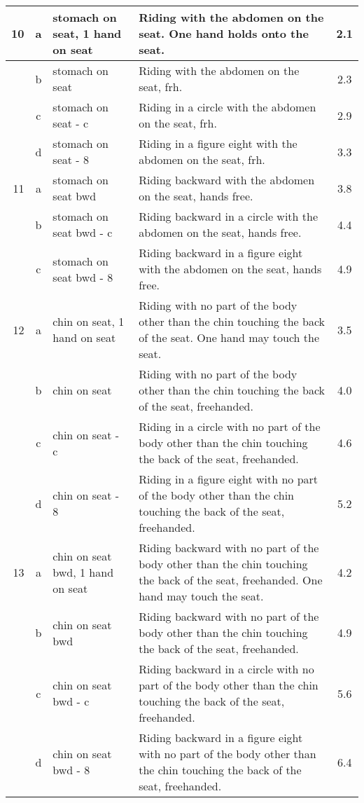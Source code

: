 \begin{longtable}{|r|c|p{4cm}|p{8cm}|c|}
\hline
10  & a & stomach on seat, 1 hand on seat & Riding with the abdomen on the seat. One hand holds onto the seat.  & 2.1 \\ 
\hline
  & b & stomach on seat & Riding with the abdomen on the seat, frh. & 2.3 \\ 
\hline
  & c & stomach on seat - c & Riding in a circle with the abdomen on the seat, frh. & 2.9 \\ 
\hline
  & d & stomach on seat - 8 & Riding in a figure eight with the abdomen on the seat, frh. & 3.3 \\ 
\hline
11  & a & stomach on seat bwd & Riding backward with the abdomen on the seat, hands free. & 3.8 \\ 
\hline
  & b & stomach on seat bwd - c & Riding backward in a circle with the abdomen on the seat, hands free. & 4.4 \\ 
\hline
  & c & stomach on seat bwd - 8 & Riding backward in a figure eight with the abdomen on the seat, hands free. & 4.9 \\ 
\hline
12  & a & chin on seat, 1 hand on seat  & Riding with no part of the body other than the chin touching the back of the seat. One hand may touch the seat. & 3.5 \\ 
\hline
  & b & chin on seat  & Riding with no part of the body other than the chin touching the back of the seat, freehanded.  & 4.0 \\ 
\hline
  & c & chin on seat - c  & Riding in a circle with no part of the body other than the chin touching the back of the seat, freehanded.  & 4.6 \\ 
\hline
  & d & chin on seat - 8  & Riding in a figure eight with no part of the body other than the chin touching the back of the seat, freehanded.  & 5.2 \\ 
\hline
13  & a & chin on seat bwd, 1 hand on seat  & Riding backward with no part of the body other than the chin touching the back of the seat, freehanded. One hand may touch the seat.  & 4.2 \\ 
\hline
  & b & chin on seat bwd  & Riding backward with no part of the body other than the chin touching the back of the seat, freehanded. & 4.9 \\ 
\hline
  & c & chin on seat bwd - c  & Riding backward in a circle with no part of the body other than the chin touching the back of the seat, freehanded. & 5.6 \\ 
\hline
  & d & chin on seat bwd - 8  & Riding backward in a figure eight with no part of the body other than the chin touching the back of the seat, freehanded. & 6.4 \\ 

\end{longtable}
